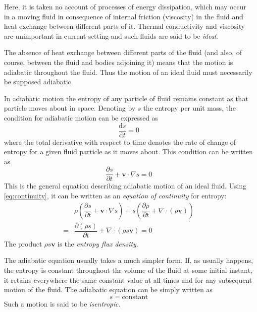 \documentclass[conference]{IEEEtran}
\theoremstyle{definition}
\theoremstyle{remark}
\begin{document}
    Here, it is taken no account of processes of energy dissipation, which may occur in a moving fluid in consequence of internal friction (viscosity) in the fluid and heat exchange between different parts of it. Thermal conductivity and viscosity are unimportant in current setting and such fluids are said to be \emph{ideal}.

    The absence of heat exchange between different parts of the fluid (and also, of course, between the fluid and bodies adjoining it) means that the motion is adiabatic throughout the fluid. Thus the motion of an ideal fluid must necessarily be supposed adiabatic.

    In adiabatic motion the entropy of any particle of fluid remains constant as that particle moves about in space. Denoting by $s$ the entropy per unit mass, the condition for adiabatic motion can be  expressed as
    \begin{equation}
        \dfrac{\mathrm{d} s}{\mathrm{d} t} = 0
    \end{equation}
    where the total derivative with respect to time denotes the rate of change of entropy for a given fluid particle as it moves about. This condition can be written as
    \begin{equation}
        \dfrac{\partial s}{\partial t} + \mathbf{v} \cdot \nabla s = 0
    \end{equation}
    This is the general equation describing adiabatic motion of an ideal fluid. Using \ref{eq:continuity}, it can be written as an \emph{equation of continuity} for entropy:
    \begin{align}
        & \rho \left(\dfrac{\partial s}{\partial t} + \mathbf{v} \cdot \nabla s \right) + s \left(\dfrac{\partial \rho}{\partial t} + \nabla \cdot (\rho \mathbf{v}) \right) \nonumber \\
        =& \dfrac{\partial (\rho s)}{\partial t} + \nabla \cdot (\rho s \mathbf{v}) = 0
    \end{align}
    The product $\rho s \mathbf{v}$ is the \emph{entropy flux density}.

    The adiabatic equation usually takes a much simpler form. If, as usually happens, the entropy is constant throughout thr volume of the fluid at some initial instant, it retains everywhere the same constant value at all times and for any subsequent motion of the fluid. The adiabatic equation can be simply written as
    \begin{equation}
        s = \text{constant}
    \end{equation}
    Such a motion is said to be \emph{isentropic}.
\end{document}

